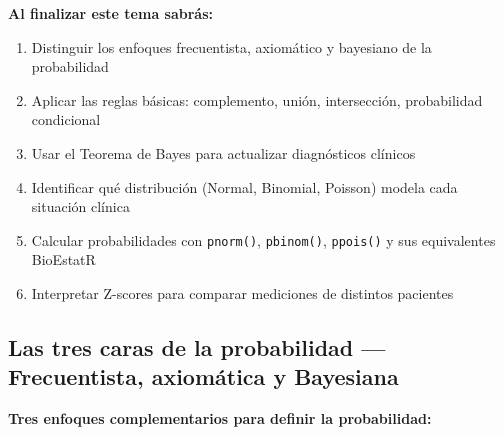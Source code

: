 \documentclass[
  letterpaper,
  DIV=11,
  numbers=noendperiod]{scrartcl}
\providecommand{\tightlist}{%
  \setlength{\itemsep}{0pt}\setlength{\parskip}{0pt}}
\begin{document}
\begin{tcolorbox}[enhanced jigsaw, arc=.35mm, bottomrule=.15mm, bottomtitle=1mm, breakable, colback=white, colbacktitle=quarto-callout-tip-color!10!white, colframe=quarto-callout-tip-color-frame, coltitle=black, left=2mm, leftrule=.75mm, opacityback=0, opacitybacktitle=0.6, rightrule=.15mm, title=\textcolor{quarto-callout-tip-color}{\faLightbulb}\hspace{0.5em}{Tip}, titlerule=0mm, toprule=.15mm, toptitle=1mm]

\textbf{Al finalizar este tema sabrás:}

\end{tcolorbox}

\begin{enumerate}
\def\labelenumi{\arabic{enumi}.}
\tightlist
\item
  Distinguir los enfoques frecuentista, axiomático y bayesiano de la
  probabilidad
\item
  Aplicar las reglas básicas: complemento, unión, intersección,
  probabilidad condicional
\item
  Usar el Teorema de Bayes para actualizar diagnósticos clínicos
\item
  Identificar qué distribución (Normal, Binomial, Poisson) modela cada
  situación clínica
\item
  Calcular probabilidades con \texttt{pnorm()}, \texttt{pbinom()},
  \texttt{ppois()} y sus equivalentes BioEstatR
\item
  Interpretar Z-scores para comparar mediciones de distintos pacientes
\end{enumerate}

\subsection{Las tres caras de la probabilidad --- Frecuentista,
axiomática y
Bayesiana}\label{las-tres-caras-de-la-probabilidad-frecuentista-axiomatica-y-bayesiana}

\textbf{Tres enfoques complementarios para definir la probabilidad:}
\end{document}
